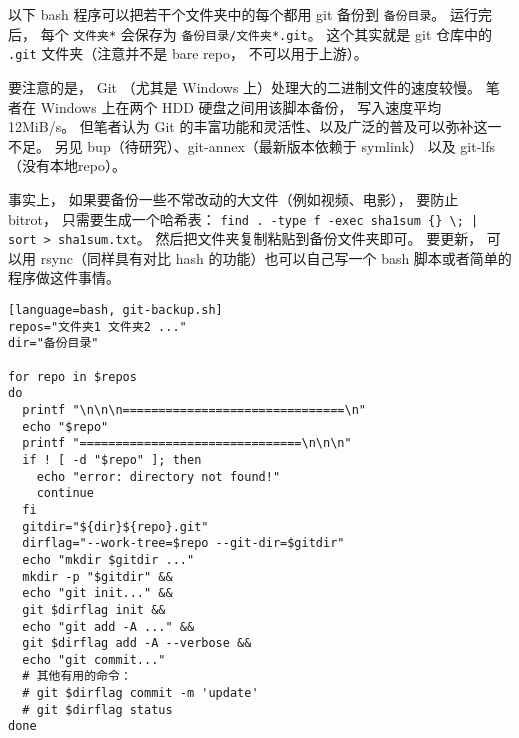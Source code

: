
\begin{issues}
\issueDraft
\end{issues}


以下 bash 程序可以把若干个文件夹中的每个都用 git 备份到 \verb|备份目录|。 运行完后， 每个 \verb|文件夹*| 会保存为 \verb|备份目录/文件夹*.git|。 这个其实就是 git 仓库中的 \verb|.git| 文件夹（注意并不是 bare repo， 不可以用于上游）。

要注意的是， Git （尤其是 Windows 上）处理大的二进制文件的速度较慢。 笔者在 Windows 上在两个 HDD 硬盘之间用该脚本备份， 写入速度平均 12MiB/s。 但笔者认为 Git 的丰富功能和灵活性、以及广泛的普及可以弥补这一不足。 另见 bup（待研究）、git-annex（最新版本依赖于 symlink） 以及 git-lfs（没有本地repo）。

事实上， 如果要备份一些不常改动的大文件（例如视频、电影）， 要防止 bitrot， 只需要生成一个哈希表： \verb`find . -type f -exec sha1sum {} \; | sort > sha1sum.txt`。 然后把文件夹复制粘贴到备份文件夹即可。 要更新， 可以用 rsync（同样具有对比 hash 的功能）也可以自己写一个 bash 脚本或者简单的程序做这件事情。

\begin{lstlisting}[language=bash, git-backup.sh]
repos="文件夹1 文件夹2 ..."
dir="备份目录"

for repo in $repos
do
  printf "\n\n\n===============================\n"
  echo "$repo"
  printf "===============================\n\n\n"
  if ! [ -d "$repo" ]; then
    echo "error: directory not found!"
    continue
  fi
  gitdir="${dir}${repo}.git"
  dirflag="--work-tree=$repo --git-dir=$gitdir"
  echo "mkdir $gitdir ..."
  mkdir -p "$gitdir" &&
  echo "git init..." &&
  git $dirflag init &&
  echo "git add -A ..." &&
  git $dirflag add -A --verbose &&
  echo "git commit..."
  # 其他有用的命令：
  # git $dirflag commit -m 'update'
  # git $dirflag status
done
\end{lstlisting}
